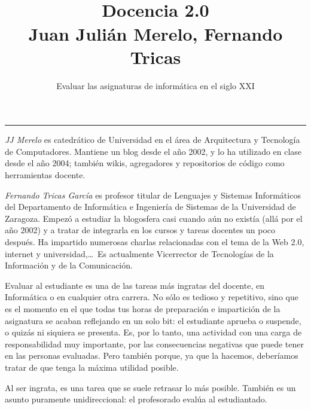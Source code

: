 \documentclass[twoside,10pt]{article}
\title{\ \\ Docencia 2.0\\ \large Juan Julián Merelo, Fernando Tricas}
\author{\LARGE Evaluar las asignaturas de informática en el siglo XXI}
\date{}
\newcounter{num}
\begin{document}
\addtocounter{page}{2}

\maketitle
\vspace*{-5ex}

\begin{multicols}{2}


\noindent\rule{86mm}{1pt}
\vspace{1ex} {\small{\begin{window} 
\noindent\emph{JJ Merelo} es catedrático de Universidad
en el área de Arquitectura y Tecnología de Computadores.
Mantiene un blog desde el año 2002, y lo ha utilizado en clase desde
el año 2004; también wikis, agregadores y repositorios de código
como herramientas docente. 
\end{window}}}

\medskip

{\small{\begin{window}
		\noindent \emph{Fernando Tricas García} es profesor
		titular de Lenguajes y Sistemas Informáticos del Departamento
		de Informática e Ingeniería de Sistemas de la Universidad de
		Zaragoza.  Empezó a estudiar la blogosfera casi cuando aún no
		existía (allá por el año 2002) y a tratar de integrarla en los
		cursos y tareas docentes un poco después.  Ha impartido
		numerosas charlas relacionadas con el tema de la Web 2.0, 
		internet y universidad,\ldots\ 
		Es actualmente Vicerrector de Tecnologías de la Información y
de la Comunicación.   
		\end{window}}}

Evaluar al estudiante es una de las tareas más ingratas del docente,
en Informática o en cualquier otra carrera. No sólo es tedioso y
repetitivo, sino que es el momento en el que todas tus horas de
preparación e impartición de la asignatura se acaban reflejando en un
solo bit: el estudiante aprueba o suspende, o quizás ni siquiera se
presenta.
Es, por lo tanto, una actividad con una carga de responsabilidad muy
	importante, por las consecuencias negativas que puede tener en las
	personas evaluadas. Pero también porque, ya que la hacemos, deberíamos tratar de que tenga la máxima utilidad posible.

Al ser ingrata, es una tarea que se suele retrasar lo más
posible. También es un asunto puramente unidireccional: el profesorado
evalúa al estudiantado.


\end{multicols}
\end{document}
